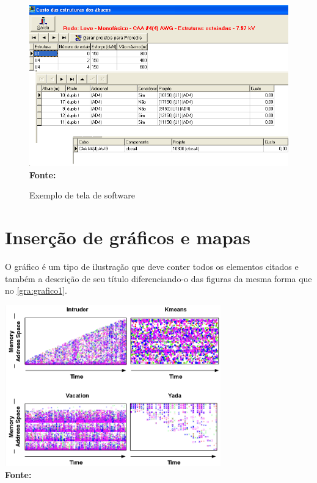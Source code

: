 \begin{figure}[!ht]
	\centering	
	\caption[\hspace{0.1cm}Exemplo de tela de software.]{Exemplo de tela de software}
	\includegraphics[width=.8\textwidth]{figuras/tela1.png}
	\\\textbf{\footnotesize Fonte: }
	\label{fig:tela1}
\end{figure}

\section{\esp Inserção de gráficos e mapas}

O gráfico é um tipo de ilustração que deve conter todos os elementos citados e também a descrição de seu título
diferenciando-o das figuras da mesma forma que no \ref{gra:grafico1}. 

\begin{grafico}
	\centering	
	\includegraphics[width=0.7\textwidth]{figuras/access.png}
	\\\textbf{\footnotesize Fonte: }
	\label{gra:grafico1}
\end{grafico}

